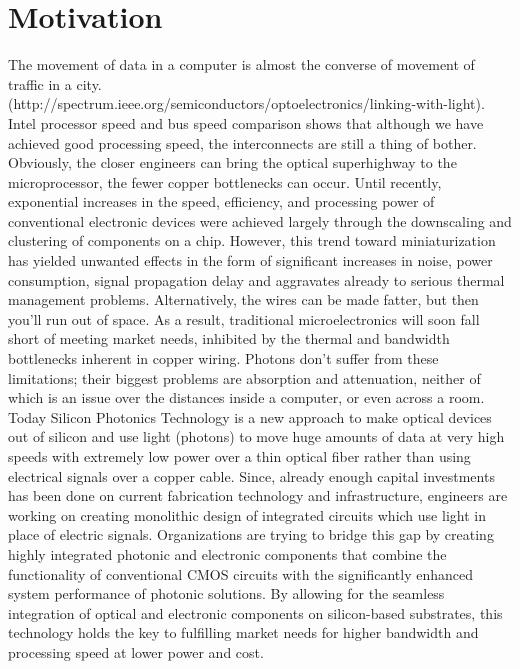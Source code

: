 \documentclass[../report.tex]{subfiles}
\begin{document}
	\section{Motivation}
The movement of data in a computer is almost the converse of movement of traffic in a city.	(http://spectrum.ieee.org/semiconductors/optoelectronics/linking-with-light). Intel processor speed and bus speed comparison shows that although we have achieved good processing speed, the interconnects are still a thing of bother. Obviously, the closer engineers can bring the optical superhighway to the microprocessor, the fewer copper bottlenecks can occur. Until recently, exponential increases in the speed, efficiency, and processing power of conventional electronic devices were achieved largely through the downscaling and clustering of components on a chip. However, this trend toward miniaturization has yielded unwanted effects in the form of significant increases in noise, power consumption, signal propagation delay and aggravates already to serious thermal management problems. Alternatively, the wires can be made fatter, but then you'll run out of space.  As a result, traditional microelectronics will soon fall short of meeting market needs, inhibited by the thermal and bandwidth bottlenecks inherent in copper wiring. Photons don't suffer from these limitations; their biggest problems are absorption and attenuation, neither of which is an issue over the distances inside a computer, or even across a room. Today Silicon Photonics Technology is a new approach to make optical devices out of silicon and use light (photons) to move huge amounts of data at very high speeds with extremely low power over a thin optical fiber rather than using electrical signals over a copper cable. Since, already enough capital investments has been done on current fabrication technology and infrastructure, engineers are working on creating monolithic design of integrated circuits which use light in place of electric signals. Organizations are trying to bridge this gap by creating highly integrated photonic and electronic components that combine the functionality of conventional CMOS circuits with the significantly enhanced system performance of photonic solutions. By allowing for the seamless integration of optical and electronic components on silicon-based substrates, this technology holds the key to fulfilling market needs for higher bandwidth and processing speed at lower power and cost.
\end{document}
